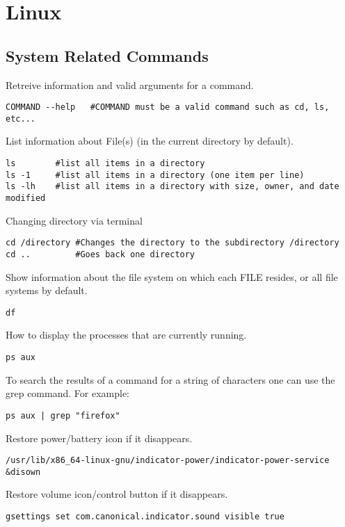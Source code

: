 \chapter{Linux}
\thispagestyle{fancy}
\lstset{language=Bash, style=bash}

\section{System Related Commands}

Retreive information and valid arguments for a command.
\begin{lstlisting}
COMMAND --help   #COMMAND must be a valid command such as cd, ls, etc...
\end{lstlisting}

List information about File(s) (in the current directory by default).
\begin{lstlisting}
ls        #list all items in a directory
ls -1     #list all items in a directory (one item per line)
ls -lh    #list all items in a directory with size, owner, and date modified
\end{lstlisting}

Changing directory via terminal
\begin{lstlisting}
cd /directory #Changes the directory to the subdirectory /directory
cd ..         #Goes back one directory
\end{lstlisting}

Show information about the file system on which each FILE resides, or all file systems by default.
\begin{lstlisting}
df 
\end{lstlisting}

How to display the processes that are currently running.
\begin{lstlisting}
ps aux
\end{lstlisting}

To search the results of a command for a string of characters one can use the grep command. For example:
\begin{lstlisting}
ps aux | grep "firefox"
\end{lstlisting}

Restore power/battery icon if it disappears.
\begin{lstlisting}
/usr/lib/x86_64-linux-gnu/indicator-power/indicator-power-service &disown 
\end{lstlisting}

Restore volume icon/control button if it disappears.
\begin{lstlisting}
gsettings set com.canonical.indicator.sound visible true
\end{lstlisting}

